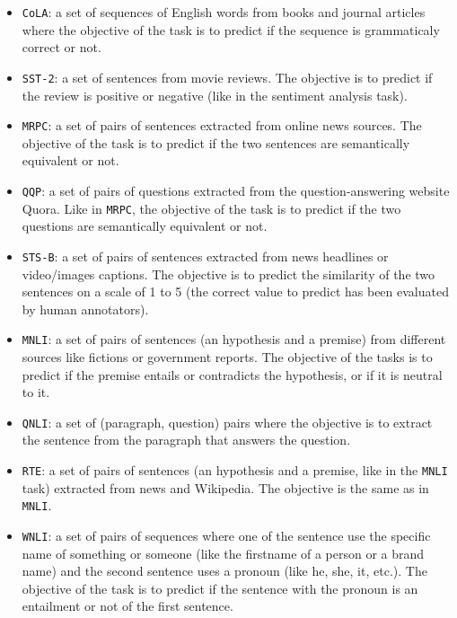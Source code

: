       \begin{itemize}
        \item \texttt{CoLA}: a set of sequences of English words from books and
          journal articles where the objective of the task is to predict if the
          sequence is grammaticaly correct or not.
        \item \texttt{SST-2}: a set of sentences from movie reviews. The
          objective is to predict if the review is positive or negative (like in
          the sentiment analysis task).
        \item \texttt{MRPC}: a set of pairs of sentences extracted from online
          news sources. The objective of the task is to predict if the two
          sentences are semantically equivalent or not.
        \item \texttt{QQP}: a set of pairs of questions extracted from the
          question-answering website Quora. Like in \texttt{MRPC}, the objective
          of the task is to predict if the two questions are semantically
          equivalent or not.
        \item \texttt{STS-B}: a set of pairs of sentences extracted from news
          headlines or video/images captions. The objective is to predict the
          similarity of the two sentences on a scale of 1 to 5 (the correct
          value to predict has been evaluated by human annotators).
        \item \texttt{MNLI}: a set of pairs of sentences (an hypothesis and a
          premise) from different sources like fictions or government reports.
          The objective of the tasks is to predict if the  premise entails or
          contradicts the hypothesis, or if it is neutral to it.
        \item \texttt{QNLI}: a set of (paragraph, question) pairs where the
          objective is to extract the sentence from the paragraph that answers
          the question.
        \item \texttt{RTE}: a set of pairs of sentences (an hypothesis and a
          premise, like in the \texttt{MNLI} task) extracted from news and
          Wikipedia. The objective is the same as in \texttt{MNLI}.
        \item \texttt{WNLI}: a set of pairs of sequences where one of the
          sentence use the specific name of something or someone (like the
          firstname of a person or a brand name) and the second sentence uses a
          pronoun (like he, she, it, etc.). The objective of the task is to
          predict if the sentence with the pronoun is an entailment or not of
          the first sentence.
      \end{itemize}

